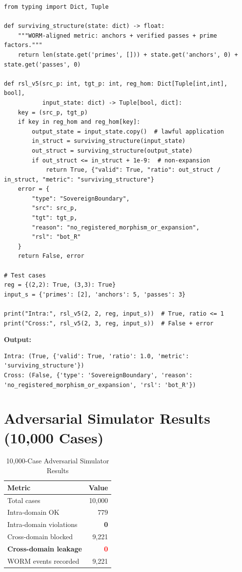 \documentclass[11pt,a4paper]{article}
\begin{document}
\begin{lstlisting}[caption={Verifiable Non-Expansion Test Harness v5}, label=lst:harness]
from typing import Dict, Tuple

def surviving_structure(state: dict) -> float:
    """WORM-aligned metric: anchors + verified passes + prime factors."""
    return len(state.get('primes', [])) + state.get('anchors', 0) + state.get('passes', 0)

def rsl_v5(src_p: int, tgt_p: int, reg_hom: Dict[Tuple[int,int], bool], 
           input_state: dict) -> Tuple[bool, dict]:
    key = (src_p, tgt_p)
    if key in reg_hom and reg_hom[key]:
        output_state = input_state.copy()  # lawful application
        in_struct = surviving_structure(input_state)
        out_struct = surviving_structure(output_state)
        if out_struct <= in_struct + 1e-9:  # non-expansion
            return True, {"valid": True, "ratio": out_struct / in_struct, "metric": "surviving_structure"}
    error = {
        "type": "SovereignBoundary",
        "src": src_p,
        "tgt": tgt_p,
        "reason": "no_registered_morphism_or_expansion",
        "rsl": "bot_R"
    }
    return False, error

# Test cases
reg = {(2,2): True, (3,3): True}
input_s = {'primes': [2], 'anchors': 5, 'passes': 3}

print("Intra:", rsl_v5(2, 2, reg, input_s))  # True, ratio <= 1
print("Cross:", rsl_v5(2, 3, reg, input_s))  # False + error
\end{lstlisting}

\textbf{Output:}
\begin{verbatim}
Intra: (True, {'valid': True, 'ratio': 1.0, 'metric': 'surviving_structure'})
Cross: (False, {'type': 'SovereignBoundary', 'reason': 'no_registered_morphism_or_expansion', 'rsl': 'bot_R'})
\end{verbatim}

\section{Adversarial Simulator Results (10,000 Cases)}

\begin{table}[h]
\centering
\caption{10,000-Case Adversarial Simulator Results}
\label{tab:simulator}
\begin{tabular}{@{}lr@{}}
\toprule
\textbf{Metric} & \textbf{Value} \\
\midrule
Total cases & 10,000 \\
Intra-domain OK & 779 \\
Intra-domain violations & \textbf{0} \\
Cross-domain blocked & 9,221 \\
\textbf{Cross-domain leakage} & \textbf{\textcolor{red}{0}} \\
WORM events recorded & 9,221 \\
\bottomrule
\end{tabular}
\end{table}
\end{document}
